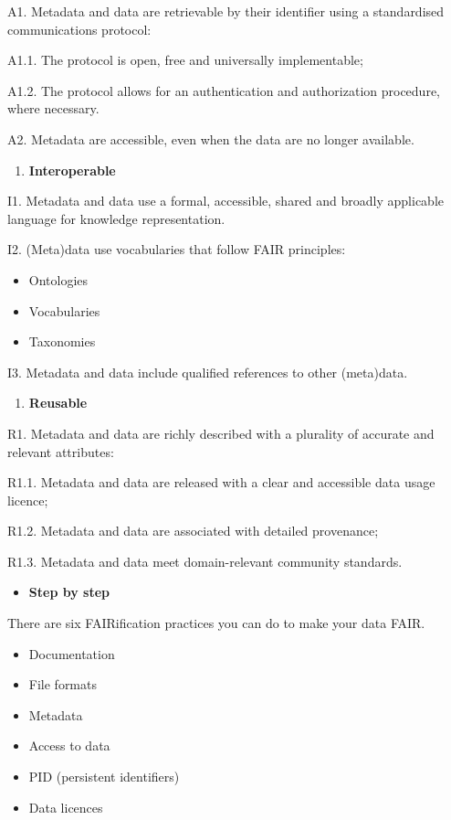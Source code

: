 \documentclass[
]{book}
\providecommand{\tightlist}{%
  \setlength{\itemsep}{0pt}\setlength{\parskip}{0pt}}
\begin{document}
A1. Metadata and data are retrievable by their identifier using a standardised communications protocol:

A1.1. The protocol is open, free and universally implementable;

A1.2. The protocol allows for an authentication and authorization procedure, where necessary.

A2. Metadata are accessible, even when the data are no longer available.

\begin{enumerate}
\def\labelenumi{\arabic{enumi}.}
\tightlist
\item
  \textbf{Interoperable}
\end{enumerate}

I1. Metadata and data use a formal, accessible, shared and broadly applicable language for knowledge representation.

I2. (Meta)data use vocabularies that follow FAIR principles:

\begin{itemize}
\tightlist
\item
  Ontologies
\item
  Vocabularies
\item
  Taxonomies
\end{itemize}

I3. Metadata and data include qualified references to other (meta)data.

\begin{enumerate}
\def\labelenumi{\arabic{enumi}.}
\tightlist
\item
  \textbf{Reusable}
\end{enumerate}

R1. Metadata and data are richly described with a plurality of accurate and relevant attributes:

R1.1. Metadata and data are released with a clear and accessible data usage licence;

R1.2. Metadata and data are associated with detailed provenance;

R1.3. Metadata and data meet domain-relevant community standards.

\begin{itemize}
\tightlist
\item
  \textbf{Step by step}
\end{itemize}

There are six FAIRification practices you can do to make your data FAIR.

\begin{itemize}
\tightlist
\item
  Documentation
\item
  File formats
\item
  Metadata
\item
  Access to data
\item
  PID (persistent identifiers)
\item
  Data licences
\end{itemize}
\end{document}

